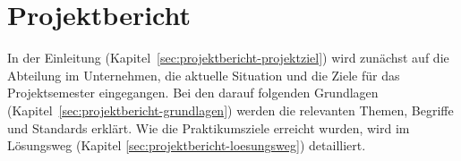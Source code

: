 
\chapter{Projektbericht} \label{ch:projektbericht}

In der Einleitung (Kapitel\ \ref{sec:projektbericht-projektziel}) wird zunächst auf die Abteilung im Unternehmen, die aktuelle Situation und die Ziele für das Projektsemester eingegangen.
Bei den darauf folgenden Grundlagen (Kapitel\ \ref{sec:projektbericht-grundlagen}) werden die relevanten Themen, Begriffe und Standards erklärt.
Wie die Praktikumsziele erreicht wurden, wird im Lösungsweg (Kapitel \ref{sec:projektbericht-loesungsweg}) detailliert.




